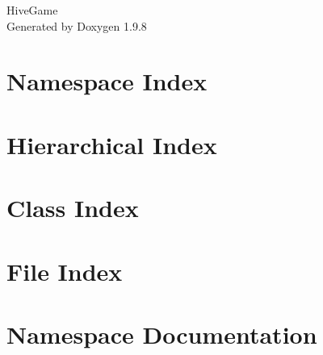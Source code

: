 \documentclass[twoside]{book}
\newcommand{\+}{\discretionary{\mbox{\scriptsize$\hookleftarrow$}}{}{}}
\newcommand{\clearemptydoublepage}{%
    \newpage{\pagestyle{empty}\cleardoublepage}%
  }
\begin{document}
  \raggedbottom
    \hypersetup{pageanchor=false,
                bookmarksnumbered=true,
                pdfencoding=unicode
               }
  \begin{titlepage}
  \vspace*{7cm}
  \begin{center}%
  {\Large Hive\+Game}\\
  \vspace*{1cm}
  {\large Generated by Doxygen 1.9.8}\\
  \end{center}
  \end{titlepage}
  \clearemptydoublepage
  \tableofcontents
  \clearemptydoublepage
  \hypersetup{pageanchor=true}

\chapter{Namespace Index}

\chapter{Hierarchical Index}

\chapter{Class Index}

\chapter{File Index}

\chapter{Namespace Documentation}












\end{document}
